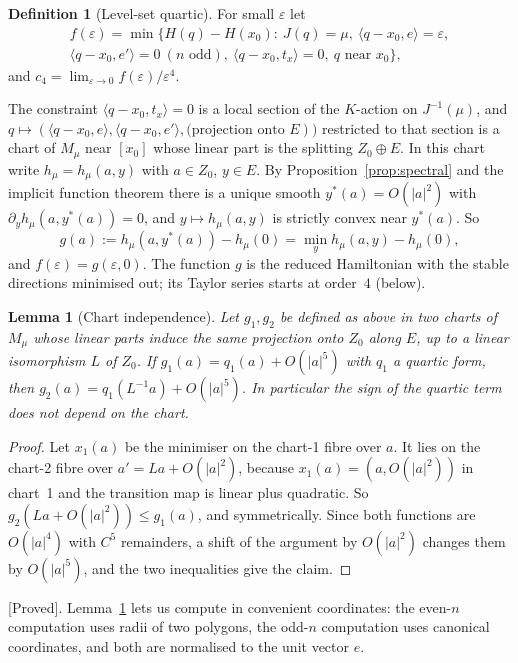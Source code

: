 \documentclass[11pt]{article}
\numberwithin{equation}{section}
\newtheorem{lemma}[theorem]{Lemma}
\theoremstyle{definition}
\newtheorem{definition}[theorem]{Definition}
\theoremstyle{remark}
\newcommand{\status}[1]{\textsf{[#1]}}
\begin{document}
\begin{definition}[Level-set quartic]\label{def:c4}
For small $\varepsilon$ let
\begin{multline*}
f(\varepsilon)=\min\big\{H(q)-H(x_0):\ J(q)=\mu,\ \langle q-x_0,e\rangle=\varepsilon,\\
\langle q-x_0,e'\rangle=0\ (n\text{ odd}),\ \langle q-x_0,t_x\rangle=0,\ q\text{ near }x_0\big\},
\end{multline*}
and $c_4=\lim_{\varepsilon\to0}f(\varepsilon)/\varepsilon^4$.
\end{definition}

The constraint $\langle q-x_0,t_x\rangle=0$ is a local section of the $K$-action on $J^{-1}(\mu)$, and
$q\mapsto(\langle q-x_0,e\rangle,\langle q-x_0,e'\rangle,\text{(projection onto }E))$ restricted to that
section is a chart of $M_\mu$ near $[x_0]$ whose linear part is the splitting $Z_0\oplus E$. In this chart
write $h_\mu=h_\mu(a,y)$ with $a\in Z_0$, $y\in E$. By Proposition~\ref{prop:spectral} and the implicit
function theorem there is a unique smooth $y^*(a)=O(|a|^2)$ with $\partial_yh_\mu(a,y^*(a))=0$, and
$y\mapsto h_\mu(a,y)$ is strictly convex near $y^*(a)$. So
\[
g(a):=h_\mu(a,y^*(a))-h_\mu(0)=\min_yh_\mu(a,y)-h_\mu(0),
\]
and $f(\varepsilon)=g(\varepsilon,0)$. The function $g$ is the reduced Hamiltonian with the stable
directions minimised out; its Taylor series starts at order~$4$ (below).

\begin{lemma}[Chart independence]\label{lem:chart}
Let $g_1,g_2$ be defined as above in two charts of $M_\mu$ whose linear parts induce the same
projection onto $Z_0$ along $E$, up to a linear isomorphism $L$ of $Z_0$. If $g_1(a)=q_1(a)+O(|a|^5)$
with $q_1$ a quartic form, then $g_2(a)=q_1(L^{-1}a)+O(|a|^5)$. In particular the sign of the quartic
term does not depend on the chart.
\end{lemma}

\begin{proof}
Let $x_1(a)$ be the minimiser on the chart-1 fibre over $a$. It lies on the chart-2 fibre over
$a'=La+O(|a|^2)$, because $x_1(a)=(a,O(|a|^2))$ in chart~1 and the transition map is linear plus
quadratic. So $g_2(La+O(|a|^2))\le g_1(a)$, and symmetrically. Since both functions are $O(|a|^4)$
with $C^5$ remainders, a shift of the argument by $O(|a|^2)$ changes them by $O(|a|^5)$, and the two
inequalities give the claim.
\end{proof}

\noindent\status{Proved}. Lemma~\ref{lem:chart} lets us compute in convenient coordinates: the even-$n$
computation uses radii of two polygons, the odd-$n$ computation uses canonical coordinates, and both are
normalised to the unit vector $e$.
\end{document}
